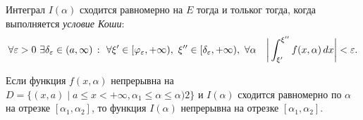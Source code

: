\begin{to_lem}
    Интеграл $I(\alpha)$ сходится равномерно на $E$ тогда и тольког тогда, когда выполняется \textit{условие Коши}: 
    \begin{equation*}
        \forall \varepsilon > 0 \ \exists \delta_\varepsilon \in (a, \infty) \ \colon \ \forall \xi' \in [\varphi_\varepsilon, + \infty), \ \xi'' \in [\delta_\varepsilon, + \infty), \  \forall \alpha
        \  \ \ 
        \bigg|
            \int_{\xi'}^{\xi''} f(x, \alpha) \d x
        \bigg| < \varepsilon.
    \end{equation*}
\end{to_lem}

\begin{to_lem}[непрерывность]
    Если функция $f(x, \alpha)$ непрерывна на $D = \{(x,a) \mid a \leq x < +\infty, \alpha_1 \leq \alpha \leq \alpha)2\}$ и $I(\alpha)$ сходится равномерно по $\alpha$ на отрезке $[\alpha_1, \alpha_2]$, то функция $I(\alpha)$ непрерывна на отрезке $[\alpha_1, \alpha_2]$.
\end{to_lem}